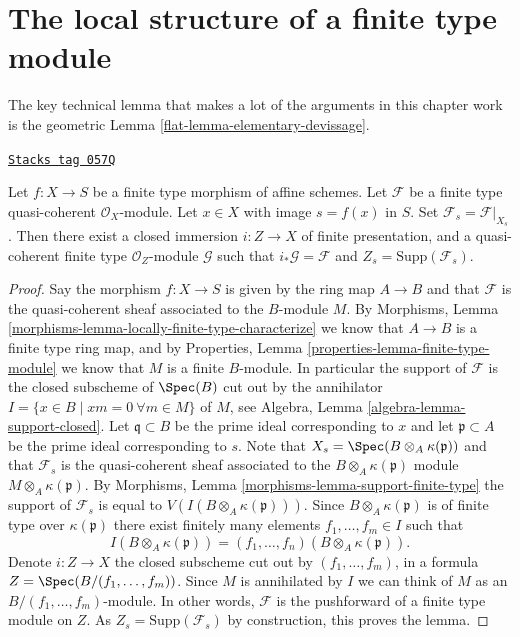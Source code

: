 \section{The local structure of a finite type module}
\label{flat-section-local-structure-module}
The key technical lemma that makes a lot of the arguments in this
chapter work is the geometric
Lemma \ref{flat-lemma-elementary-devissage}.

\begin{lemma}
\label{flat-lemma-sheaf-lives-on-subscheme}
\href{https://stacks.math.columbia.edu/tag/057Q}{\texttt{Stacks tag 057Q}}

Let $f : X \to S$ be a finite type morphism of affine schemes.
Let $\mathcal{F}$ be a finite type quasi-coherent $\mathcal{O}_X$-module.
Let $x \in X$ with image $s = f(x)$ in $S$.
Set $\mathcal{F}_s = \mathcal{F}|_{X_s}$.
Then there exist a closed immersion $i : Z \to X$ of finite presentation,
and a quasi-coherent finite type $\mathcal{O}_Z$-module $\mathcal{G}$
such that $i_*\mathcal{G} = \mathcal{F}$ and
$Z_s = \text{Supp}(\mathcal{F}_s)$.
\end{lemma}

\begin{proof}
Say the morphism $f : X \to S$ is given by the ring map
$A \to B$ and that $\mathcal{F}$ is the quasi-coherent sheaf
associated to the $B$-module $M$. By
Morphisms, Lemma \ref{morphisms-lemma-locally-finite-type-characterize}
we know that $A \to B$ is a finite type ring map, and by
Properties, Lemma \ref{properties-lemma-finite-type-module}
we know that $M$ is a finite $B$-module. In particular the
support of $\mathcal{F}$ is the closed subscheme of $\Spec(B)$
cut out by the annihilator
$I = \{x \in B \mid xm = 0\ \forall m \in M\}$ of $M$, see
Algebra, Lemma \ref{algebra-lemma-support-closed}.
Let $\mathfrak q \subset B$ be the prime ideal corresponding to $x$
and let $\mathfrak p \subset A$ be the prime ideal corresponding to $s$.
Note that $X_s = \Spec(B \otimes_A \kappa(\mathfrak p))$ and
that $\mathcal{F}_s$ is the quasi-coherent sheaf associated to the
$B \otimes_A \kappa(\mathfrak p)$ module $M \otimes_A \kappa(\mathfrak p)$. By
Morphisms, Lemma \ref{morphisms-lemma-support-finite-type}
the support of $\mathcal{F}_s$ is equal to
$V(I(B \otimes_A \kappa(\mathfrak p)))$. Since
$B \otimes_A \kappa(\mathfrak p)$ is of finite type over $\kappa(\mathfrak p)$
there exist finitely many elements $f_1, \ldots, f_m \in I$
such that
$$
I(B \otimes_A \kappa(\mathfrak p)) =
(f_1, \ldots, f_n)(B \otimes_A \kappa(\mathfrak p)).
$$
Denote $i : Z \to X$ the closed subscheme cut out by
$(f_1, \ldots, f_m)$, in a formula $Z = \Spec(B/(f_1, \ldots, f_m))$.
Since $M$ is annihilated by $I$ we can think of $M$ as an
$B/(f_1, \ldots, f_m)$-module. In other words, $\mathcal{F}$ is the
pushforward of a finite type module on $Z$.
As $Z_s = \text{Supp}(\mathcal{F}_s)$ by construction, this
proves the lemma.
\end{proof}

